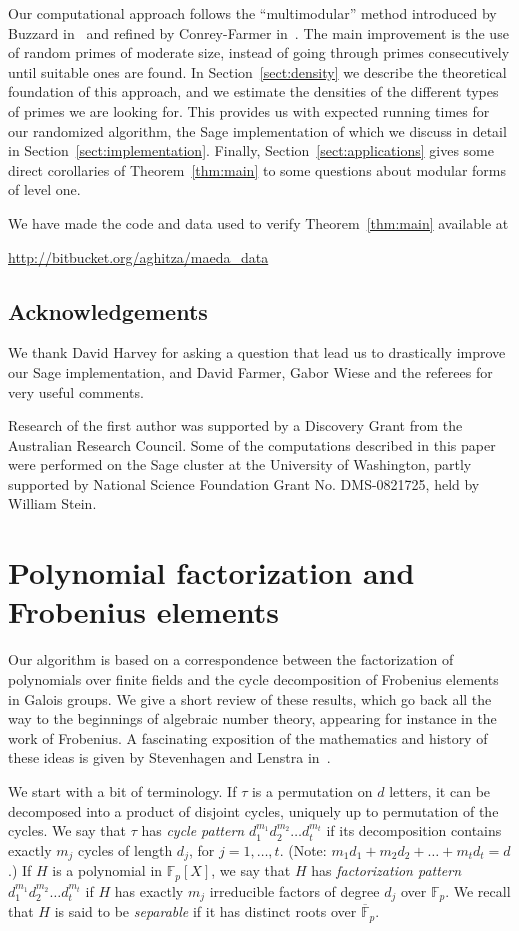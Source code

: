 \documentclass{book}
\newcommand{\FF}{\mathbb{F}}
\begin{document}
Our computational approach follows the ``multimodular'' method introduced by
Buzzard in~\cite{Buzzard} and refined by Conrey-Farmer in~\cite{ConreyFarmer}.
The main improvement is the use of random primes of moderate size, instead of
going through primes consecutively until suitable ones are found.  In
Section~\ref{sect:density} we describe the theoretical foundation of this
approach, and we estimate the densities of the different types of primes we
are looking for.  This provides us with expected running times for our
randomized algorithm, the Sage implementation of which we discuss in detail in
Section~\ref{sect:implementation}.  Finally, Section~\ref{sect:applications}
gives some direct corollaries of Theorem~\ref{thm:main} to some questions
about modular forms of level one.

We have made the code and data used to verify Theorem~\ref{thm:main} available
at 

\centerline{\url{http://bitbucket.org/aghitza/maeda_data}}

\subsection*{Acknowledgements}
We thank David Harvey for asking a question that lead us to
  drastically improve our Sage implementation, and David Farmer, Gabor Wiese
and the referees for very useful comments.
  
Research of the first author was supported by 
a Discovery Grant from the Australian Research Council.
Some of the computations described in this paper were performed on the Sage
cluster at the University of Washington, partly supported by National 
Science Foundation Grant No. DMS-0821725, held by William Stein.

\section{Polynomial factorization and Frobenius elements}
\label{sect:frobenius}
Our algorithm is based on a correspondence between the factorization of
polynomials over finite fields and the cycle decomposition of Frobenius
elements in Galois groups.  We give a short review of these
results, which go back all the way to the beginnings of algebraic number theory,
appearing for instance in the work of Frobenius.  A fascinating exposition of the
mathematics and history of these ideas is given by Stevenhagen and Lenstra
in~\cite{StevenhagenLenstra}.

We start with a bit of terminology.  If $\tau$ is a permutation on $d$ letters, 
it can be decomposed into a product of disjoint cycles, uniquely up to
permutation of the cycles.  We say that $\tau$ has \emph{cycle pattern}
$d_1^{m_1}d_2^{m_2}\ldots d_t^{m_t}$ if its decomposition contains exactly
$m_j$ cycles of length $d_j$, for $j=1,\ldots,t$.  
  (Note: $m_1d_1+m_2d_2+\ldots +m_td_t=d$.) 
If $H$ is a polynomial in
$\FF_p[X]$, we say that $H$ has \emph{factorization pattern}
$d_1^{m_1}d_2^{m_2}\ldots d_t^{m_t}$ if $H$ has exactly $m_j$ irreducible
factors of degree $d_j$ over $\FF_p$.  We recall that $H$ is said to be
\emph{separable} if it has distinct roots over $\overline{\FF}_p$.
\end{document}

